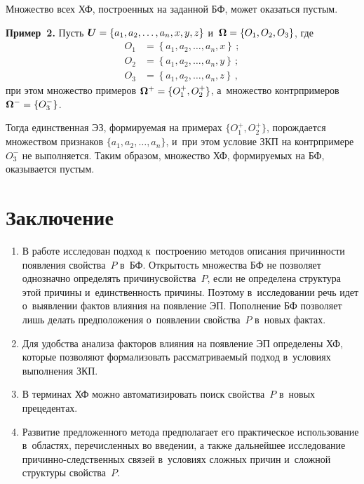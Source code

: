\begin{multicols}{2}
  Множество всех ХФ, построенных на заданной БФ, может оказаться пустым.
  \smallskip
  
  \noindent
  \textbf{Пример~2.} Пусть $\boldsymbol{U}\hm= \{a_1, a_2,\ldots , a_n, x,y,z\}$ 
и~$\boldsymbol{\Omega}\hm =\{ O_1, O_2, O_3\}$, где
  \begin{align*}
   O_1&= \left\{a_1, a_2, \ldots , a_n, x\right\}\,;\\
  O_2&= \left\{a_1, a_2, \ldots , a_n, y\right\}\,;\\
  O_3&= \left\{a_1, a_2, \ldots , a_n, z\right\}\,,
  \end{align*}
  при этом множество примеров $\boldsymbol{\Omega}^+\hm= \{O_1^+, O_2^+\}$, 
а~множество контрпримеров $\boldsymbol{\Omega}^-\hm= \{O_3^-\}$. 

  Тогда единственная ЭЗ, формируемая на примерах $\{O_1^+, O_2^+\}$, 
порождается множеством признаков $\{a_1, a_2,\ldots , a_n\}$, и~при этом условие 
ЗКП на контрпримере~$O_3^-$ не выполняется. Таким образом, множество ХФ, 
формируемых на БФ, оказывается пустым.
  
  \section{Заключение }
  
  \noindent
  \begin{enumerate}[1.]
\item В работе исследован подход к~построению методов описания причинности 
появления свойства~$P$ в~БФ. Открытость множества БФ не позволяет 
однозначно определять причину\linebreak свойства~$P$, если не определена структура 
этой причины и~единственность причины. Поэтому в~исследовании речь идет 
о~выявлении фактов влияния на появление ЭП. Пополнение БФ позволяет лишь 
делать предположения о~появлении свойства~$P$ в~новых фактах. 
\item Для удобства анализа факторов влияния на появление ЭП определены ХФ, 
которые позволяют формализовать рассматриваемый подход в~условиях 
выполнения ЗКП. 
\item В терминах ХФ можно автоматизировать поиск свойства~$P$ в~новых 
прецедентах. 
\item Развитие предложенного метода предполагает его практическое 
использование в~областях, перечисленных во введении, а также дальнейшее 
исследование при\-чин\-но-след\-ст\-вен\-ных связей в~условиях сложных 
причин и~сложной структуры свойства~$P$. 
\end{enumerate}
  

\end{multicols}
